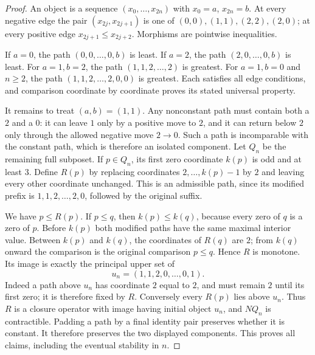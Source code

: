 \begin{proof}
An object is a sequence $(x_0,\ldots,x_{2n})$ with $x_0=a$, $x_{2n}=b$. At every negative edge the pair $(x_{2j},x_{2j+1})$ is one of $(0,0),(1,1),(2,2),(2,0)$; at every positive edge $x_{2j+1}\leq x_{2j+2}$. Morphisms are pointwise inequalities.

If $a=0$, the path $(0,0,\ldots,0,b)$ is least. If $a=2$, the path $(2,0,\ldots,0,b)$ is least. For $a=1,b=2$, the path $(1,1,2,\ldots,2)$ is greatest. For $a=1,b=0$ and $n\geq2$, the path $(1,1,2,\ldots,2,0,0)$ is greatest. Each satisfies all edge conditions, and comparison coordinate by coordinate proves its stated universal property.

It remains to treat $(a,b)=(1,1)$. Any nonconstant path must contain both a $2$ and a $0$: it can leave $1$ only by a positive move to $2$, and it can return below $2$ only through the allowed negative move $2\to0$. Such a path is incomparable with the constant path, which is therefore an isolated component. Let $Q_n$ be the remaining full subposet. If $p\in Q_n$, its first zero coordinate $k(p)$ is odd and at least $3$. Define $R(p)$ by replacing coordinates $2,\ldots,k(p)-1$ by $2$ and leaving every other coordinate unchanged. This is an admissible path, since its modified prefix is $1,1,2,\ldots,2,0$, followed by the original suffix.

We have $p\leq R(p)$. If $p\leq q$, then $k(p)\leq k(q)$, because every zero of $q$ is a zero of $p$. Before $k(p)$ both modified paths have the same maximal interior value. Between $k(p)$ and $k(q)$, the coordinates of $R(q)$ are $2$; from $k(q)$ onward the comparison is the original comparison $p\leq q$. Hence $R$ is monotone. Its image is exactly the principal upper set of
\[
 u_n=(1,1,2,0,\ldots,0,1).
\]
Indeed a path above $u_n$ has coordinate $2$ equal to $2$, and must remain $2$ until its first zero; it is therefore fixed by $R$. Conversely every $R(p)$ lies above $u_n$. Thus $R$ is a closure operator with image having initial object $u_n$, and $NQ_n$ is contractible. Padding a path by a final identity pair preserves whether it is constant. It therefore preserves the two displayed components. This proves all claims, including the eventual stability in $n$.
\end{proof}

